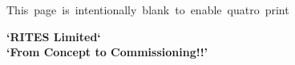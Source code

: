 \documentclass[11pt,twoside,openany,svgnames,x11names]{gkbookm1}
\begin{document}

%

%



\clearpage
\pagestyle{empty}\newpage\mbox{This page is intentionally blank to enable quatro print}


% 
\clearpage
\enlargethispage{3\baselineskip}
\thispagestyle{empty}

\pagecolor[HTML]{0E0407}   %

\begin{center}
\begin{minipage}{.8\textwidth}
\color{Cornsilk}\Large\bfseries

\begin{center}
\huge\bfseries\sffamily\color{lime}`RITES Limited` \\ `From Concept to Commissioning!!'
\end{center}




\end{minipage}
\end{center}
\end{document}
